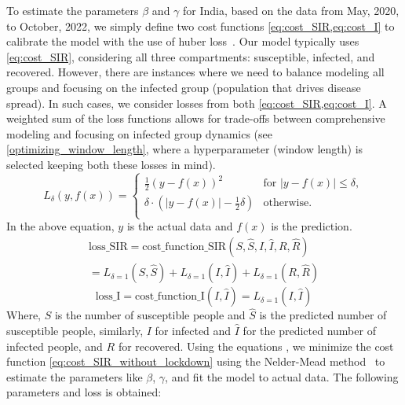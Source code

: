 \documentclass[tikz,fleqn,12pt]{wlscirep}
\begin{document}
To estimate the parameters $\beta$ and $\gamma$ for India, based on the data from May, 2020, to October, 2022, we simply define two cost functions \cref{eq:cost_SIR,eq:cost_I} to calibrate the model with the use of huber loss~\cite{huberloss}. Our model typically uses \cref{eq:cost_SIR}, considering all three compartments: susceptible, infected, and recovered. However, there are instances where we need to balance modeling all groups and focusing on the infected group (population that drives disease spread). In such cases, we consider losses from both \cref{eq:cost_SIR,eq:cost_I}. A weighted sum of the loss functions allows for trade-offs between comprehensive modeling and focusing on infected group dynamics (see \cref{optimizing_window_length}, where a hyperparameter (window length) is selected keeping both these losses in mind).
\begin{equation}
  L_{\delta}(y, f(x)) = 
  \begin{cases}
    \frac{1}{2}{(y - f(x))^2} & \text{for } |y - f(x)| \leq \delta, \\
    \delta \cdot (|y - f(x)| - \frac{1}{2}\delta) & \text{otherwise.} \\
  \end{cases}
  \label{eq:huberloss}
\end{equation}
In the above equation, $y$ is the actual data and $f(x)$ is the prediction.
\begin{equation}
  \begin{split}
  \textrm{loss\_SIR} = \textrm{cost\_function\_SIR}(S, \hat{S}, I, \hat{I}, R, \hat{R}) \\
  = L_{\delta = 1}(S, \hat{S}) + L_{\delta = 1}(I, \hat{I}) + L_{\delta = 1}(R, \hat{R})
  \end{split}
  \label{eq:cost_SIR}
\end{equation}
\begin{equation}
  \textrm{loss\_I} = \textrm{cost\_function\_I}(I, \hat{I}) = L_{\delta = 1}(I, \hat{I})
  \label{eq:cost_I}
\end{equation}
Where, $S$ is the number of susceptible people and $\hat{S}$ is the predicted number of susceptible people, similarly, $I$ for infected and $\hat{I}$ for the predicted number of infected people, and $R$ for recovered. Using the equations , we minimize the cost function \cref{eq:cost_SIR_without_lockdown} using the Nelder-Mead method~\cite{Gao2010} to estimate the parameters like $\beta$, $\gamma$, and fit the model to actual data. The following parameters and loss is obtained:
\end{document}
